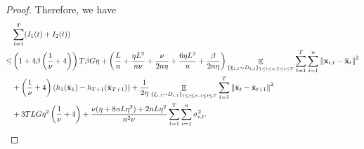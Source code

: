 \documentclass{article}
\begin{document}
\begin{proof}
Therefore, we have 
\begin{align}
\nonumber
&\sum_{t=1}^T (I_1(t) + I_2(t)) \\ \nonumber
\le & \left( 1 + 4\beta\left( \frac{1}{\nu}+4 \right) \right)T\beta G \eta + \left(  \frac{L}{n} + \frac{\eta L^2}{n\nu} + \frac{\nu}{2n\eta} + \frac{6\eta L^2}{n}  + \frac{\beta}{2n\eta}  \right)\mathop{\mathbb{E}}_{ \{\xi_{i,t} \sim D_{i,t}\}_{1\le i \le n, 1\le t\le T} }\sum_{t=1}^T\sum_{i=1}^n\left\lVert{\bf x}_{i,t} - \bar{{\bf x}}_t \right\rVert^2 \\ \nonumber 
&+ \left( \frac{1}{\nu} + 4 \right)\left( h_1(\bar{{\bf x}}_1) - h_{T+1}(\bar{{\bf x}}_{T+1}) \right) + \frac{1}{2\eta}\mathop{\mathbb{E}}_{ \{\xi_{i,t} \sim D_{i,t}\}_{1\le i \le n, 1\le t\le T} }\sum_{t=1}^T\left\lVert \bar{{\bf x}}_t - \bar{{\bf x}}_{t+1}\right\rVert^2 \\ \nonumber 
& + 3TLG\eta^2\left(  \frac{1}{\nu} + 4  \right) + \frac{\nu(\eta + 8nL\eta^2) + 2nL\eta^2}{n^2\nu} \sum_{t=1}^T\sum_{i=1}^n\sigma_{i,t}^2.
\end{align}







\end{proof}
\end{document}
